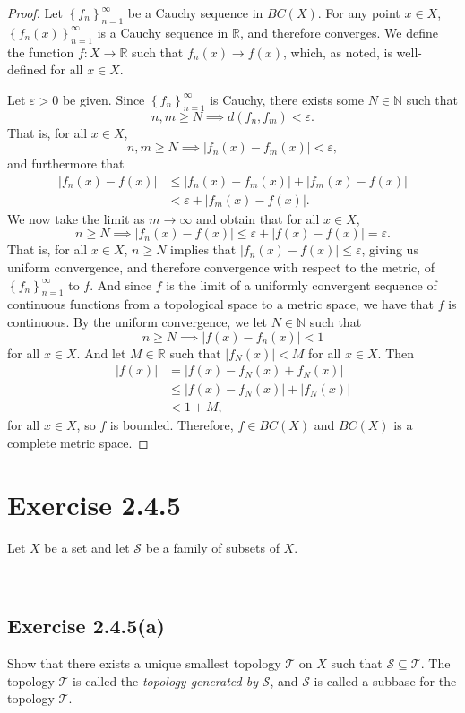 \documentclass[12pt]{article}
\newenvironment{problem}
    {\begin{lrbox}{\mybox}\begin{minipage}{\textwidth-10pt}}
    {\end{minipage}\end{lrbox}\framebox[6.5in]{\usebox{\mybox}}\\}
\newcommand{\seq}[2]{\left\{#1\right\}_{#2=1}^\infty}
\newcommand{\N}{\mathbb{N}}
\newcommand{\R}{\mathbb{R}}
\let\eps\varepsilon
\newcommand{\T}{\mathscr{T}}
\renewcommand{\S}{\mathscr{S}}
\begin{document}
\begin{proof}
    Let $\seq{f_n}{n}$ be a Cauchy sequence in $BC(X)$. For any point $x\in X$, $\seq{f_n(x)}{n}$ is a Cauchy sequence in $\R$, and therefore converges. We define the function $f:X\to\R$ such that $f_n(x)\to f(x)$, which, as noted, is well-defined for all $x\in X$.
    
    Let $\eps>0$ be given. Since $\seq{f_n}{n}$ is Cauchy, there exists some $N\in\N$ such that
    \[n,m\geq N \implies d(f_n,f_m)<\eps.\]
    That is, for all $x\in X$,
    \[n,m\geq N \implies |f_n(x)-f_m(x)|<\eps,\]
    and furthermore that
    \begin{align*}
        |f_n(x)-f(x)|
            &\leq |f_n(x) - f_m(x)| + |f_m(x)-f(x)| \\
            &< \eps + |f_m(x)-f(x)|.
    \end{align*}
    We now take the limit as $m\to\infty$ and obtain that for all $x\in X$,
    \[n\geq N \implies |f_n(x)-f(x)| \leq \eps + |f(x)-f(x)| = \eps.\]
    That is, for all $x\in X$, $n\geq N$ implies that $|f_n(x)-f(x)|\leq\eps$, giving us uniform convergence, and therefore convergence with respect to the metric, of $\seq{f_n}{n}$ to $f$. And since $f$ is the limit of a uniformly convergent sequence of continuous functions from a topological space to a metric space, we have that $f$ is continuous. By the uniform convergence, we let $N\in\N$ such that
    \[n\geq N \implies |f(x)-f_n(x)|<1\]
    for all $x\in X$. And let $M\in\R$ such that $|f_N(x)|<M$ for all $x\in X$. Then
    \begin{align*}
        |f(x)|
            &= |f(x)-f_N(x)+f_N(x)| \\
            &\leq |f(x)-f_N(x)| + |f_N(x)| \\
            & < 1 + M,
    \end{align*}
    for all $x\in X$, so $f$ is bounded. Therefore, $f\in BC(X)$  and $BC(X)$ is a complete metric space.
    
\end{proof}

\section*{Exercise 2.4.5}
\begin{problem}
Let $X$ be a set and let $\S$ be a family of subsets of $X$.
\end{problem}

\subsection*{Exercise 2.4.5(a)}
\begin{problem}
    Show that there exists a unique smallest topology $\T$ on $X$ such that $\S\subseteq\T$. The topology $\T$ is called the \emph{topology generated by} $\S$, and $\S$ is called a subbase for the topology $\T$.
\end{problem}
\end{document}
